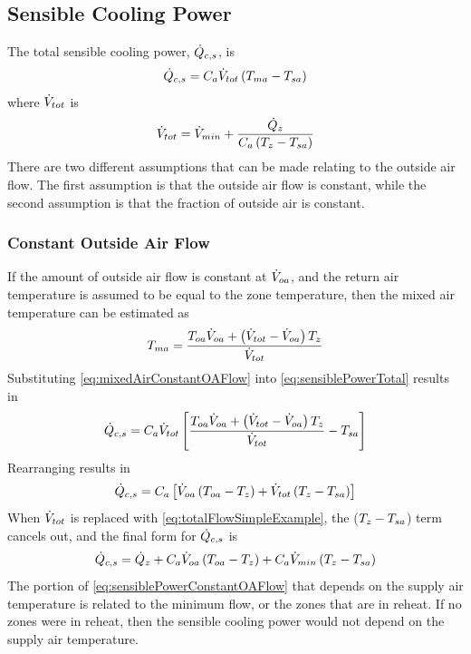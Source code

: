 \subsection{Sensible Cooling Power}

\newcommand{\totalFlow}{\flow{min} +
\frac{\heatenergy{z}}{C_{a}\left(T_{z}-\sat{}\right)}}
The total sensible cooling power, \(\dot{Q}_{c,s}\), is
\begin{equation}\label{eq:sensiblePowerTotal}
    \dot{Q}_{c,s} =  C_{a} \dot{V}_{tot} \left(T_{ma}{}-T_{sa}{}\right)
\end{equation}
where \(\dot{V}_{tot}\) is 
\begin{equation}\label{eq:totalFlowSimpleExample}
    \flow{tot} = \totalFlow{}
\end{equation}
There are two different assumptions that can be made relating to the
outside air flow. The first assumption is that the outside air flow is
constant, while the second assumption is that the fraction of outside
air is constant. 

\subsubsection{Constant Outside Air Flow} 

If the amount of outside air flow is constant at \(\dot{V}_{oa}\), and the
return air temperature is assumed to be equal to the zone temperature,
then the mixed air temperature can be estimated as 
\begin{equation}\label{eq:mixedAirConstantOAFlow}
    T_{ma}{} = \frac{T_{oa}{} \dot{V}_{oa} + \left(\dot{V}_{tot}-\dot{V}_{oa}\right) T_{z}}{\dot{V}_{tot}} 
\end{equation}
Substituting  \ref{eq:mixedAirConstantOAFlow} into
\ref{eq:sensiblePowerTotal} results in
\begin{equation}
    \dot{Q}_{c,s} = C_{a} \dot{V}_{tot} \left[ \frac{T_{oa}{} \dot{V}_{oa} +
    \left(\dot{V}_{tot}-\dot{V}_{oa}\right) T_{z}}{\dot{V}_{tot}}  - T_{sa}{}  \right]
\end{equation}
Rearranging results in
\begin{equation}
    \dot{Q}_{c,s} = C_{a} \left[ \dot{V}_{oa} \left(T_{oa}{} - T_{z}\right) + \dot{V}_{tot}
    \left(T_{z} - T_{sa}{}\right)  \right]
\end{equation}
When \(\dot{V}_{tot}\) is replaced with 
\ref{eq:totalFlowSimpleExample}, the (\(T_{z}-T_{sa}{}\)) term cancels
out, and the final form for \(\dot{Q}_{c,s}\) is 
\begin{equation}\label{eq:sensiblePowerConstantOAFlow}
    \dot{Q}_{c,s} = \dot{Q}_{z} + C_{a} \dot{V}_{oa}
    \left(T_{oa}{}-T_{z}\right)  + C_{a} \dot{V}_{min} \left(T_{z} - T_{sa}{} \right)
\end{equation}
The portion of  \ref{eq:sensiblePowerConstantOAFlow} that
depends on the supply air temperature is related to the minimum flow, or
the zones that are in reheat. If no zones were in reheat, then the
sensible cooling power would not depend on the supply air temperature. 


